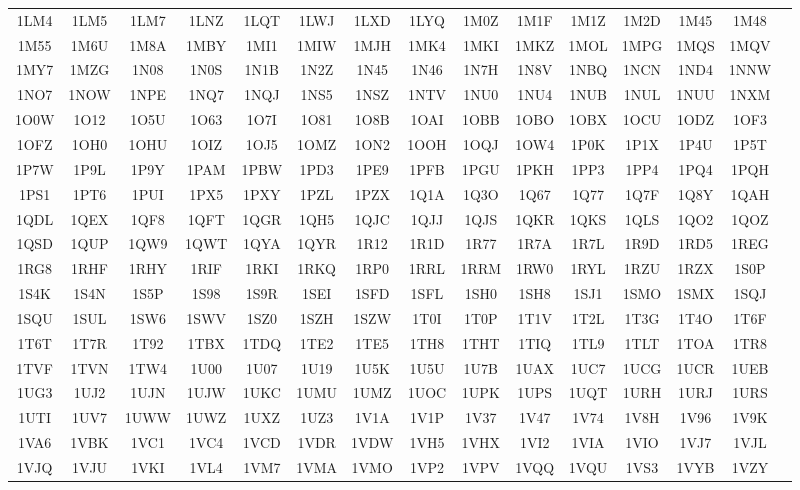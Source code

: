 \begin{longtable}{ c c c c c c c c c c c c c c c }
	1LM4 & 1LM5 & 1LM7 & 1LNZ & 1LQT & 1LWJ & 1LXD & 1LYQ & 1M0Z & 1M1F & 1M1Z & 1M2D & 1M45 & 1M48  \\
	1M55 & 1M6U & 1M8A & 1MBY & 1MI1 & 1MIW & 1MJH & 1MK4 & 1MKI & 1MKZ & 1MOL & 1MPG & 1MQS & 1MQV  \\
	1MY7 & 1MZG & 1N08 & 1N0S & 1N1B & 1N2Z & 1N45 & 1N46 & 1N7H & 1N8V & 1NBQ & 1NCN & 1ND4 & 1NNW  \\
	1NO7 & 1NOW & 1NPE & 1NQ7 & 1NQJ & 1NS5 & 1NSZ & 1NTV & 1NU0 & 1NU4 & 1NUB & 1NUL & 1NUU & 1NXM  \\
	1O0W & 1O12 & 1O5U & 1O63 & 1O7I & 1O81 & 1O8B & 1OAI & 1OBB & 1OBO & 1OBX & 1OCU & 1ODZ & 1OF3  \\
	1OFZ & 1OH0 & 1OHU & 1OIZ & 1OJ5 & 1OMZ & 1ON2 & 1OOH & 1OQJ & 1OW4 & 1P0K & 1P1X & 1P4U & 1P5T  \\
	1P7W & 1P9L & 1P9Y & 1PAM & 1PBW & 1PD3 & 1PE9 & 1PFB & 1PGU & 1PKH & 1PP3 & 1PP4 & 1PQ4 & 1PQH  \\
	1PS1 & 1PT6 & 1PUI & 1PX5 & 1PXY & 1PZL & 1PZX & 1Q1A & 1Q3O & 1Q67 & 1Q77 & 1Q7F & 1Q8Y & 1QAH  \\
	1QDL & 1QEX & 1QF8 & 1QFT & 1QGR & 1QH5 & 1QJC & 1QJJ & 1QJS & 1QKR & 1QKS & 1QLS & 1QO2 & 1QOZ  \\
	1QSD & 1QUP & 1QW9 & 1QWT & 1QYA & 1QYR & 1R12 & 1R1D & 1R77 & 1R7A & 1R7L & 1R9D & 1RD5 & 1REG  \\
	1RG8 & 1RHF & 1RHY & 1RIF & 1RKI & 1RKQ & 1RP0 & 1RRL & 1RRM & 1RW0 & 1RYL & 1RZU & 1RZX & 1S0P  \\
	1S4K & 1S4N & 1S5P & 1S98 & 1S9R & 1SEI & 1SFD & 1SFL & 1SH0 & 1SH8 & 1SJ1 & 1SMO & 1SMX & 1SQJ  \\
	1SQU & 1SUL & 1SW6 & 1SWV & 1SZ0 & 1SZH & 1SZW & 1T0I & 1T0P & 1T1V & 1T2L & 1T3G & 1T4O & 1T6F  \\
	1T6T & 1T7R & 1T92 & 1TBX & 1TDQ & 1TE2 & 1TE5 & 1TH8 & 1THT & 1TIQ & 1TL9 & 1TLT & 1TOA & 1TR8  \\
	1TVF & 1TVN & 1TW4 & 1U00 & 1U07 & 1U19 & 1U5K & 1U5U & 1U7B & 1UAX & 1UC7 & 1UCG & 1UCR & 1UEB  \\
	1UG3 & 1UJ2 & 1UJN & 1UJW & 1UKC & 1UMU & 1UMZ & 1UOC & 1UPK & 1UPS & 1UQT & 1URH & 1URJ & 1URS  \\
	1UTI & 1UV7 & 1UWW & 1UWZ & 1UXZ & 1UZ3 & 1V1A & 1V1P & 1V37 & 1V47 & 1V74 & 1V8H & 1V96 & 1V9K  \\
	1VA6 & 1VBK & 1VC1 & 1VC4 & 1VCD & 1VDR & 1VDW & 1VH5 & 1VHX & 1VI2 & 1VIA & 1VIO & 1VJ7 & 1VJL  \\
	1VJQ & 1VJU & 1VKI & 1VL4 & 1VM7 & 1VMA & 1VMO & 1VP2 & 1VPV & 1VQQ & 1VQU & 1VS3 & 1VYB & 1VZY  \\

\end{longtable}
